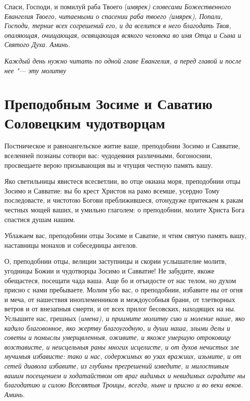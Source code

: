 Спаси, Господи, и помилуй раба Твоего (\itshape имярек\normalfont{}) словесами Божественного Евангелия Твоего, читаемыми о спасении раба твоего (\itshape имярек\normalfont{}), Попали, Господи, терние всех согрешений его, и да вселится в него благодать Твоя, опаляющая, очищающая, освящающая всякого человека во имя Отца и Сына и Святого Духа. Аминь.


\itshape Каждый день нужно читать по одной главе Евангелия, а перед главой и после нее "--- эту молитву\normalfont{}


 
\mychapterending


 

\section{Преподобным Зосиме и Саватию Соловецким чудотворцам}
 




Постническое и равноангельское житие ваше, преподобнии Зосимо и Савватие, вселенней познаны сотвори вас: чудодеяния различными, богоноснии, просвещаете верою призывающия вы и чтущия честную память вашу.




Яко светильницы явистеся всесветлии, во отце окиана моря, преподобнии отцы Зосимо и Савватие: вы бо крест Христов на рамо всемше, усердно Тому последовасте, и чистотою Богови преближившеся, отонудуже притекаем к ракам честных мощей ваших, и умильно глаголем: о преподобнии, молите Христа Бога спастися душам нашим.




Ублажаем вас, преподобнии отцы Зосиме и Саватие, и чтим святую память вашу, наставницы монахов и собеседницы ангелов.




О, преподобнии отцы, велиции заступницы и скории услышателие молитв, угодницы Божии и чудотворцы Зосимо и Савватие! Не забудите, якоже обещастеся, посещати чада ваша. Аще бо и отъидосте от нас телом, но духом присно с нами пребываете. Молим убо вас, о преподобнии, избавите ны от огня и меча, от нашествия иноплеменников и междоусобныя брани, от тлетворных ветров и от внезапныя смерти, и от всех прилог бесовских, находящих на ны. Услышите нас, грешных (\itshape имена\normalfont{}), и приимите молитву сию и моление наше, яко кадило благовонное, яко жертву благоугодную, и души наша, злыми делы и советы и помыслы умерщвленныя, оживите, и якоже умершую отроковицу возстависте, и неисцельныя раны многих исцелисте, и от духов нечистых зле мучимыя избависте: тако и нас, содержимых во узах вражиих, изьмите, и от сетей диавола избавите, из глубины прегрешений изведите, и милостивым вашим посещением и ходатайством от враг видимых и невидимых оградите ны благодатию и силою Всесвятыя Троицы, всегда, ныне и присно и во веки веков. Аминь.



